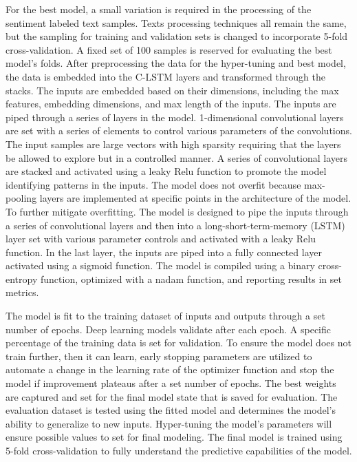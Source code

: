 \documentclass[conference,final,]{IEEEtran}
\begin{document}
For the best model, a small variation is required in the processing of the sentiment labeled text samples.
Texts processing techniques all remain the same, but the sampling for training and validation sets is changed to incorporate 5-fold cross-validation.
A fixed set of 100 samples is reserved for evaluating the best model's folds.
After preprocessing the data for the hyper-tuning and best model, the data is embedded into the C-LSTM layers and transformed through the stacks.
The inputs are embedded based on their dimensions, including the max features, embedding dimensions, and max length of the inputs.
The inputs are piped through a series of layers in the model. 1-dimensional convolutional layers are set with a series of elements to control various parameters of the convolutions.
The input samples are large vectors with high sparsity requiring that the layers be allowed to explore but in a controlled manner.
A series of convolutional layers are stacked and activated using a leaky Relu function to promote the model identifying patterns in the inputs.
The model does not overfit because max-pooling layers are implemented at specific points in the architecture of the model.
To further mitigate overfitting.
The model is designed to pipe the inputs through a series of convolutional layers and then into a long-short-term-memory (LSTM) layer set with various parameter controls and activated with a leaky Relu function.
In the last layer, the inputs are piped into a fully connected layer activated using a sigmoid function.
The model is compiled using a binary cross-entropy function, optimized with a nadam function, and reporting results in set metrics.

The model is fit to the training dataset of inputs and outputs through a set number of epochs.
Deep learning models validate after each epoch.
A specific percentage of the training data is set for validation.
To ensure the model does not train further, then it can learn, early stopping parameters are utilized to automate a change in the learning rate of the optimizer function and stop the model if improvement plateaus after a set number of epochs.
The best weights are captured and set for the final model state that is saved for evaluation.
The evaluation dataset is tested using the fitted model and determines the model's ability to generalize to new inputs.
Hyper-tuning the model's parameters will ensure possible values to set for final modeling.
The final model is trained using 5-fold cross-validation to fully understand the predictive capabilities of the model.
\end{document}
